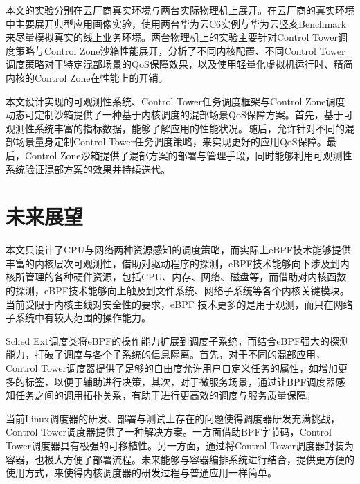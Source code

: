 本文的实验分别在云厂商真实环境与两台实际物理机上展开。在云厂商的真实环境中主要展开典型应用画像实验，使用两台华为云C6实例与华为云竖亥Benchmark来尽量模拟真实的线上业务环境。两台物理机上的实验主要针对Control Tower调度策略与Control Zone沙箱性能展开，分析了不同内核配置、不同Control Tower调度策略对于特定混部场景的QoS保障效果，以及使用轻量化虚拟机运行时、精简内核的Control Zone在性能上的开销。

本文设计实现的可观测性系统、Control Tower任务调度框架与Control Zone调度动态可定制沙箱提供了一种基于内核调度的混部场景QoS保障方案。首先，基于可观测性系统丰富的指标数据，能够了解应用的性能状况。随后，允许针对不同的混部场景量身定制Control Tower任务调度策略，来实现更好的应用QoS保障。最后，Control Zone沙箱提供了混部方案的部署与管理手段，同时能够利用可观测性系统验证混部方案的效果并持续迭代。

\section{未来展望}

本文只设计了CPU与网络两种资源感知的调度策略，而实际上eBPF技术能够提供丰富的内核层次可观测性，借助对驱动程序的探测，eBPF技术能够向下涉及到内核所管理的各种硬件资源，包括CPU、内存、网络、磁盘等，而借助对内核函数的探测，eBPF技术能够向上触及到文件系统、网络子系统等各个内核关键模块。当前受限于内核主线对安全性的要求，eBPF 技术更多的是用于观测，而只在网络子系统中有较大范围的操作能力。

Sched Ext调度类将eBPF的操作能力扩展到调度子系统，而结合eBPF强大的探测能力，打破了调度与各个子系统的信息隔离。首先，对于不同的混部应用，Control Tower调度器提供了足够的自由度允许用户自定义任务的属性，如增加更多的标签，以便于辅助进行决策，其次，对于微服务场景，通过让BPF调度器感知任务之间的调用拓扑关系，有助于进行更高效的调度与服务质量保障。

当前Linux调度器的研发、部署与测试上存在的问题使得调度器研发充满挑战，Control Tower调度器提供了一种解决方案。一方面借助BPF字节码，Control Tower调度器具有极强的可移植性。另一方面，通过将Control Tower调度器封装为容器，也极大方便了部署流程。未来能够与容器编排系统进行结合，提供更方便的使用方式，来使得内核调度器的研发过程与普通应用一样简单。



